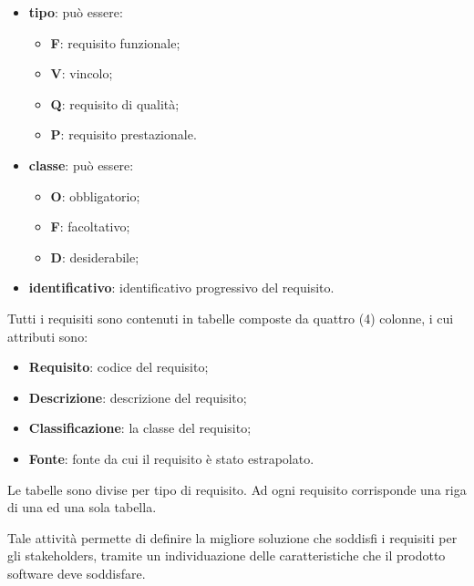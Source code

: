 	    \begin{itemize}
	        \item \textbf{tipo}: può essere:
	        \begin{itemize}
	            \item \textbf{F}: requisito funzionale;
	            \item \textbf{V}: vincolo;
	            \item \textbf{Q}: requisito di qualità;
	            \item \textbf{P}: requisito prestazionale. 
	        \end{itemize}
	        \item \textbf{classe}: può essere:
	        \begin{itemize}
	            \item \textbf{O}: obbligatorio;
	            \item \textbf{F}: facoltativo;
	            \item \textbf{D}: desiderabile;
	        \end{itemize}
	        \item \textbf{identificativo}: identificativo progressivo del requisito.
	    \end{itemize}
	    Tutti i requisiti sono contenuti in tabelle composte da quattro (4) colonne, i cui attributi sono:
	    \begin{itemize}
	        \item \textbf{Requisito}: codice del requisito;
	        \item \textbf{Descrizione}: descrizione del requisito;
	        \item \textbf{Classificazione}: la classe del requisito;
	        \item \textbf{Fonte}: fonte da cui il requisito è stato estrapolato.
	    \end{itemize}
	    Le tabelle sono divise per tipo di requisito. Ad ogni requisito corrisponde una riga di una ed una sola tabella.
		
		Tale attività permette di definire la migliore soluzione che soddisfi i requisiti per gli stakeholders, tramite un individuazione delle caratteristiche che il prodotto software deve soddisfare.
		
